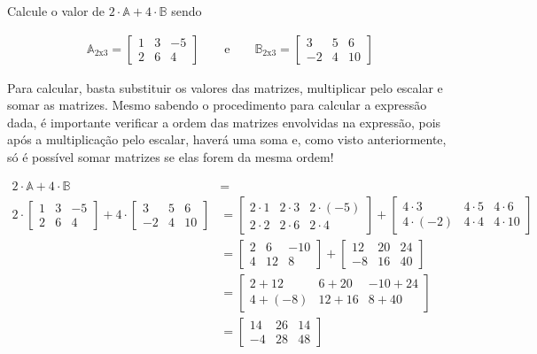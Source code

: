 \begin{example}
	Calcule o valor de $2\cdot \mathbb{A}+4\cdot \mathbb{B}$ sendo
	
	\begin{ceqn}
		\begin{align*}
			\mathbb{A}_{2\mathrm{x}3}=\begin{bmatrix}1 & 3 & -5\\
		2 & 6 & 4
		\end{bmatrix}\qquad\mathrm{e}\qquad\mathbb{B}_{2\mathrm{x}3}=\begin{bmatrix}3 & 5 & 6\\
		-2 & 4 & 10
		\end{bmatrix}
		\end{align*}
	\end{ceqn}

	Para calcular, basta substituir os valores das matrizes, multiplicar pelo escalar e somar as matrizes. Mesmo sabendo o procedimento para calcular a expressão dada, é importante verificar a ordem das matrizes envolvidas na expressão, pois após a multiplicação pelo escalar, haverá uma soma e, como visto anteriormente, só é possível somar matrizes se elas forem da mesma ordem!
	
	\begin{ceqn}
		\begin{align*}
		2\cdot\mathbb{A}+4\cdot\mathbb{B} & =\\
		2\cdot\begin{bmatrix}1 & 3 & -5\\
		2 & 6 & 4
		\end{bmatrix}+4\cdot\begin{bmatrix}3 & 5 & 6\\
		-2 & 4 & 10
		\end{bmatrix} & =  \begin{bmatrix}2\cdot1 & 2\cdot3 & 2\cdot(-5)\\
		2\cdot2 & 2\cdot6 & 2\cdot4
		\end{bmatrix}+\begin{bmatrix}4\cdot3 & 4\cdot5 & 4\cdot6\\
		4\cdot(-2) & 4\cdot4 & 4\cdot10
		\end{bmatrix}\\
		& =  \begin{bmatrix}2 & 6 & -10\\
		4 & 12 & 8
		\end{bmatrix}+\begin{bmatrix}12 & 20 & 24\\
		-8 & 16 & 40
		\end{bmatrix}\\
		& =  \begin{bmatrix}2+12 & 6+20 & -10+24\\
		4+(-8) & 12+16 & 8+40
		\end{bmatrix}\\
		& =  \begin{bmatrix}14 & 26 & 14\\
		-4 & 28 & 48
		\end{bmatrix}
		\end{align*}
	\end{ceqn}

\end{example}


